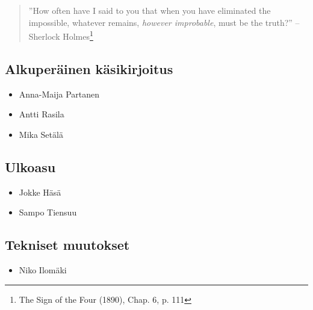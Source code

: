 \begin{quote}
''How often have I said to you that when you have eliminated the impossible, whatever remains, \emph{however improbable}, must be the truth?'' -- Sherlock Holmes\footnote{The Sign of the Four (1890), Chap. 6, p. 111}
\end{quote}

\subsection*{Alkuperäinen käsikirjoitus}
\begin{itemize}
\item Anna-Maija Partanen
\item Antti Rasila
\item Mika Setälä
\end{itemize}

\subsection*{Ulkoasu}
\begin{itemize}
\item Jokke Häsä
\item Sampo Tiensuu
\end{itemize}

\subsection*{Tekniset muutokset}
\begin{itemize}
\item Niko Ilomäki
\end{itemize}
